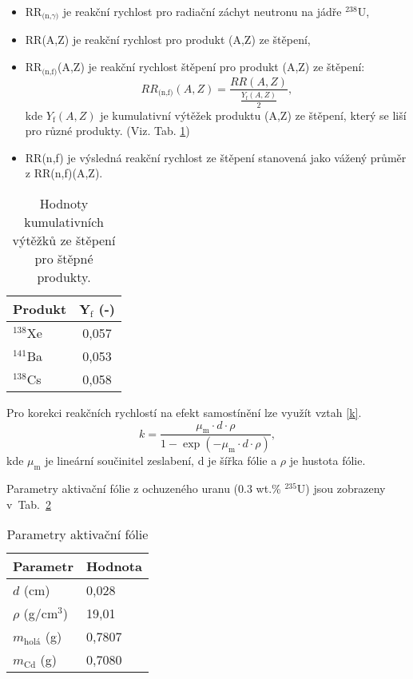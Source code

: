 \begin{itemize}
    \item  RR$_\text{(n,$\gamma$)}$ je reakční rychlost pro radiační záchyt neutronu na jádře $^{238}$U,
    \item  RR(A,Z) je reakční rychlost pro produkt (A,Z) ze štěpení, 
    \item  RR$_\text{(n,f)}$(A,Z) je reakční  rychlost štěpení pro produkt (A,Z) ze štěpení:
    \begin{equation} \label{RR(n,f)(A,Z)}
       RR_\text{(n,f)}(A,Z) = \frac{RR(A,Z)}{\frac{Y_\text{f}(A,Z)}{2}},
    \end{equation}
    kde $Y_\text{f}(A,Z)$ je kumulativní výtěžek produktu (A,Z) ze štěpení, který se liší pro různé produkty. (Viz. Tab. \ref{výtěžek})
    
    \item  RR(n,f) je výsledná reakční rychlost ze štěpení stanovená jako vážený průměr z RR(n,f)(A,Z).
\end{itemize}

\begin{table}[H]
\centering
\caption{Hodnoty kumulativních výtěžků ze štěpení pro štěpné produkty.}
\label{výtěžek}
\begin{tabular}{@{}lc@{}}
\toprule
Produkt    & Y$_\text{f}$ (-) \\ \midrule
$^{138}$Xe & 0,057        \\
$^{141}$Ba & 0,053        \\
$^{138}$Cs & 0,058        \\ \bottomrule
\end{tabular}
\end{table}

Pro korekci reakčních rychlostí na efekt samostínění lze využít vztah \eqref{k}.
\begin{equation} \label{k}
    k = \frac{\mu_\text{m}\cdot d \cdot \rho}{1-\exp(-\mu_\text{m}\cdot d \cdot \rho)},
\end{equation}
kde $\mu_\text{m}$ je lineární součinitel zeslabení, d je šířka fólie a $\rho$ je hustota fólie.

Parametry aktivační fólie z ochuzeného uranu (0.3 wt.\% $^{235}$U) jsou zobrazeny v~Tab.~\ref{folie} 

\begin{table}[h]
\centering
\caption{Parametry aktivační fólie}
\label{folie}
\begin{tabular}{@{}ll@{}}
\toprule
Parametr            & Hodnota \\ \midrule
$d$ (cm)            & 0,028   \\
$\rho$ (g/cm$^3$)   & 19,01   \\
$m_\text{holá}$ (g) & 0,7807  \\
$m_\text{Cd}$ (g)   & 0,7080  \\ \bottomrule
\end{tabular}
\end{table}

